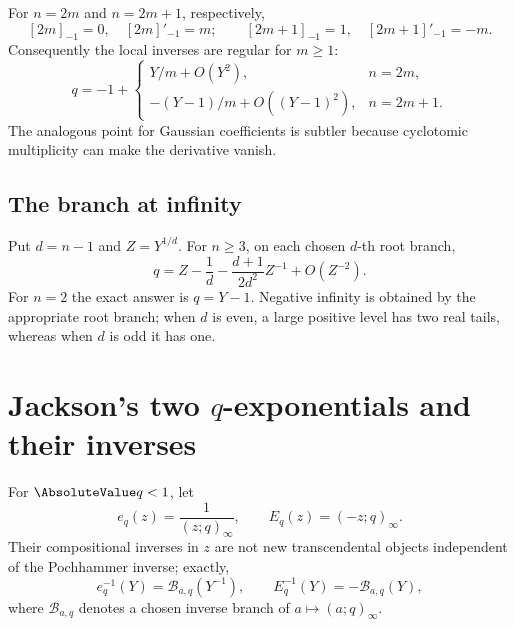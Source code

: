 \documentclass[11pt,a4paper,oneside,openany]{book}
\theoremstyle{definition}
\theoremstyle{remark}
\newcommand{\branch}{\mathscr B}
\begin{document}
For \(n=2m\) and \(n=2m+1\), respectively,
\begin{equation}\label{eq:q-integer-minus-one-values}
 [2m]_{-1}=0,
 \quad [2m]'_{-1}=m;
 \qquad
 [2m+1]_{-1}=1,
 \quad [2m+1]'_{-1}=-m.
\end{equation}
Consequently the local inverses are regular for \(m\ge1\):
\begin{equation}\label{eq:q-integer-minus-one-inverse}
 q=-1+\begin{cases}
 Y/m+O(Y^2),&n=2m,\\
 -(Y-1)/m+O((Y-1)^2),&n=2m+1.
 \end{cases}
\end{equation}
The analogous point for Gaussian coefficients is subtler because cyclotomic
multiplicity can make the derivative vanish.

\subsection{The branch at infinity}

Put \(d=n-1\) and \(Z=Y^{1/d}\).  For \(n\ge3\), on each chosen \(d\)-th
root branch,
\begin{equation}\label{eq:q-integer-infinity-inverse}
 q=Z-\frac1d-\frac{d+1}{2d^2}Z^{-1}+O(Z^{-2}).
\end{equation}
For \(n=2\) the exact answer is \(q=Y-1\).  Negative infinity is obtained by
the appropriate root branch; when \(d\) is even, a large positive level has
two real tails, whereas when \(d\) is odd it has one.

\section{Jackson's two \texorpdfstring{$q$}{q}-exponentials and their inverses}

For \(\AbsoluteValue q<1\), let
\begin{equation}\label{eq:q-exponentials}
 e_q(z)=\frac1{(z;q)_\infty},
 \qquad
 E_q(z)=(-z;q)_\infty.
\end{equation}
Their compositional inverses in \(z\) are not new transcendental objects
independent of the Pochhammer inverse; exactly,
\begin{equation}\label{eq:q-exponential-poinverse}
 e_q^{-1}(Y)=\branch_{a,q}(Y^{-1}),
 \qquad
 E_q^{-1}(Y)=-\branch_{a,q}(Y),
\end{equation}
where \(\branch_{a,q}\) denotes a chosen inverse branch of
\(a\mapsto(a;q)_\infty\).
\end{document}
